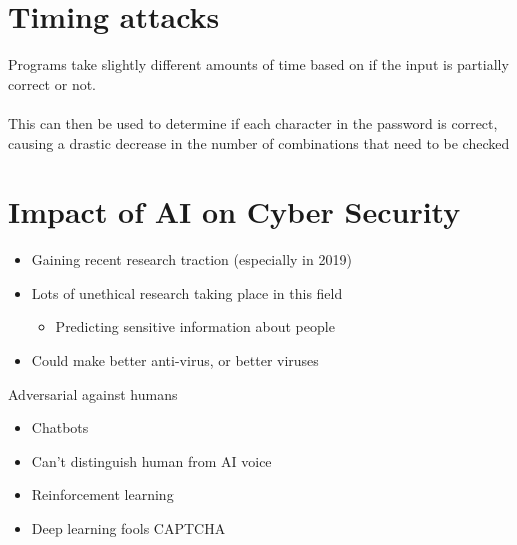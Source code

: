 \documentclass{article}[18pt]
\begin{document}
\section{Timing attacks}
Programs take slightly different amounts of time based on if the input is partially correct or not.\\
\\
This can then be used to determine if each character in the password is correct, causing a drastic decrease in the number of combinations that need to be checked
\section{Impact of AI on Cyber Security}
\begin{itemize}
	\item Gaining recent research traction (especially in 2019)
	\item Lots of unethical research taking place in this field
	\begin{itemize}
		\item Predicting sensitive information about people
	\end{itemize}
	\item Could make better anti-virus, or better viruses
\end{itemize}
Adversarial against humans
\begin{itemize}
	\item Chatbots
	\item Can't distinguish human from AI voice
	\item Reinforcement learning
	\item Deep learning fools CAPTCHA
\end{itemize}
\end{document}
